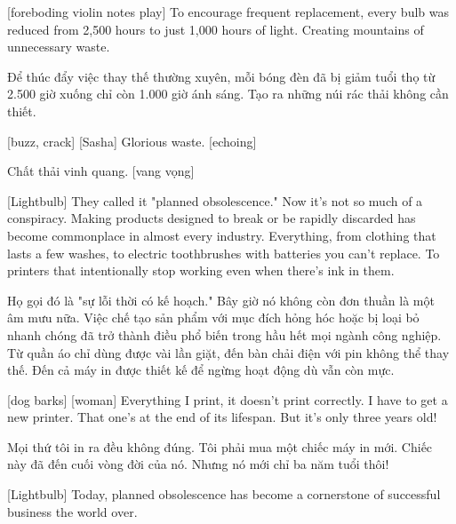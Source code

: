 \documentclass[a4paper]{article}
\begin{document}
	[foreboding violin notes play]
	To encourage frequent replacement, every bulb was reduced from 2,500 hours to just 1,000 hours of light.
	Creating mountains of unnecessary waste.
	
	\begin{vietnamese-v2}
		 Để thúc đẩy việc thay thế thường xuyên, mỗi bóng đèn đã bị giảm tuổi thọ từ 2.500 giờ xuống chỉ còn 1.000 giờ ánh sáng. Tạo ra những núi rác thải không cần thiết.
	\end{vietnamese-v2}
	
	[buzz, crack]
	[Sasha] Glorious waste. [echoing]
	
	\begin{vietnamese-v2}
		 Chất thải vinh quang. [vang vọng]
	\end{vietnamese-v2}
	
	[Lightbulb] They called it "planned obsolescence."
	Now it's not so much of a conspiracy.
	Making products designed to break or be rapidly discarded has become commonplace in almost every industry.
	Everything, from clothing that lasts a few washes, to electric toothbrushes with batteries you can't replace.
	To printers that intentionally stop working even when there's ink in them.
	
	\begin{vietnamese-v2}
		 Họ gọi đó là "sự lỗi thời có kế hoạch." Bây giờ nó không còn đơn thuần là một âm mưu nữa. Việc chế tạo sản phẩm với mục đích hỏng hóc hoặc bị loại bỏ nhanh chóng đã trở thành điều phổ biến trong hầu hết mọi ngành công nghiệp. Từ quần áo chỉ dùng được vài lần giặt, đến bàn chải điện với pin không thể thay thế. Đến cả máy in được thiết kế để ngừng hoạt động dù vẫn còn mực.
	\end{vietnamese-v2}
	
	[dog barks]
	[woman] Everything I print, it doesn't print correctly.
	I have to get a new printer. That one's at the end of its lifespan.
	But it's only three years old!
	
	\begin{vietnamese-v2}
		 Mọi thứ tôi in ra đều không đúng. 
		Tôi phải mua một chiếc máy in mới. Chiếc này đã đến cuối vòng đời của nó. 
		Nhưng nó mới chỉ ba năm tuổi thôi!
	\end{vietnamese-v2}
	
	[Lightbulb] Today, planned obsolescence has become a cornerstone of successful business the world over.
	
\end{document}
